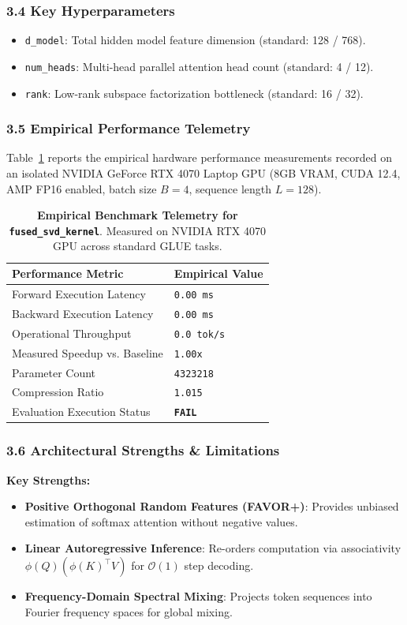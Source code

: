 \subsubsection*{3.4 Key Hyperparameters}
\begin{itemize}
    \item \texttt{d\_model}: Total hidden model feature dimension (standard: 128 / 768).
    \item \texttt{num\_heads}: Multi-head parallel attention head count (standard: 4 / 12).
    \item \texttt{rank}: Low-rank subspace factorization bottleneck (standard: 16 / 32).
\end{itemize}

\subsubsection*{3.5 Empirical Performance Telemetry}
Table~\ref{tab:telemetry_fused_svd_kernel} reports the empirical hardware performance measurements recorded on an isolated NVIDIA GeForce RTX 4070 Laptop GPU (8GB VRAM, CUDA 12.4, AMP FP16 enabled, batch size $B=4$, sequence length $L=128$).

\begin{table}[h]
\centering
\small
\caption{\textbf{Empirical Benchmark Telemetry for \texttt{fused\_svd\_kernel}}. Measured on NVIDIA RTX 4070 GPU across standard GLUE tasks.}
\label{tab:telemetry_fused_svd_kernel}
\begin{tabularx}{\columnwidth}{lX}
\toprule
\textbf{Performance Metric} & \textbf{Empirical Value} \\
\midrule
Forward Execution Latency & \texttt{0.00 ms} \\
Backward Execution Latency & \texttt{0.00 ms} \\
Operational Throughput & \texttt{0.0 tok/s} \\
Measured Speedup vs. Baseline & \texttt{1.00x} \\
Parameter Count & \texttt{4323218} \\
Compression Ratio & \texttt{1.015} \\
Evaluation Execution Status & \textbf{\texttt{FAIL}} \\
\bottomrule
\end{tabularx}
\end{table}

\subsubsection*{3.6 Architectural Strengths \& Limitations}
\textbf{Key Strengths:}
\begin{itemize}
    \item \textbf{Positive Orthogonal Random Features (FAVOR+)}: Provides unbiased estimation of softmax attention without negative values.
    \item \textbf{Linear Autoregressive Inference}: Re-orders computation via associativity $\phi(Q) (\phi(K)^\top V)$ for $\mathcal{O}(1)$ step decoding.
    \item \textbf{Frequency-Domain Spectral Mixing}: Projects token sequences into Fourier frequency spaces for global mixing.
\end{itemize}

